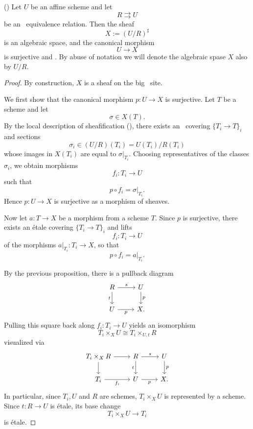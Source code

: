 \begin{lemma}
	\label{lem:etale-eq-quotient-of-affines}
	(\cite[Tag 03I2]{stacks-project})
	Let $U$ be an affine scheme and let
	\[
	R \rightrightarrows U
	\]
	be an \etale\ equivalence relation. Then the sheaf
	\[
	X:=(U/R)^\sharp
	\]
	is an algebraic space, and the canonical morphism
	\[
	U\to X
	\]
	is surjective and \etale.
	By abuse of notation we will denote the algebraic spase $X$ also by $U/R$.
\end{lemma}

\begin{proof}
	By construction, $X$ is a sheaf on the big \etale\ site.
	
	We first show that the canonical morphism $p:U\to X$ is surjective. Let $T$ be a scheme and let
	\[
	\sigma\in X(T).
	\]
	By the local description of sheafification (\cite[][Tag 00WK]{stacks-project}), there exists an \etale\ covering $\{T_i\to T\}_i$ and sections
	\[
	\sigma_i\in (U/R)(T_i)=U(T_i)/R(T_i)
	\]
	whose images in $X(T_i)$ are equal to $\sigma|_{T_i}$. Choosing representatives of the classes $\sigma_i$, we obtain morphisms
	\[
	f_i:T_i\to U
	\]
	such that
	\[
	p\circ f_i=\sigma|_{T_i}.
	\]
	Hence $p:U\to X$ is surjective as a morphism of sheaves.
	
	Now let $a:T\to X$ be a morphism from a scheme $T$. Since $p$ is surjective, there exists an \'etale covering $\{T_i\to T\}_i$ and lifts
	\[
	f_i:T_i\to U
	\]
	of the morphisms $a|_{T_i}:T_i\to X$, so that
	\[
	p\circ f_i=a|_{T_i}.
	\]
	
	By the previous proposition, there is a pullback diagram
	\[
	\begin{tikzcd}
		R \arrow[r,"s"] \arrow[d,"t"'] & U \arrow[d,"p"] \\
		U \arrow[r,"p"'] & X.
	\end{tikzcd}
	\]
	Pulling this square back along $f_i:T_i\to U$ yields an isomorphism
	\[
	T_i\times_X U \cong T_i\times_{U,t} R 
	\]
	visualized via
	\[\begin{tikzcd}
		{T_i\times_XR} & R & U \\
		{T_i} & U & X.
		\arrow[from=1-1, to=1-2]
		\arrow[from=1-1, to=2-1]
		\arrow["s", from=1-2, to=1-3]
		\arrow["t"', from=1-2, to=2-2]
		\arrow["p", from=1-3, to=2-3]
		\arrow["{f_i}"', from=2-1, to=2-2]
		\arrow["p"', from=2-2, to=2-3]
	\end{tikzcd}\]
	In particular, since $T_i, U$ and $R$ are schemes, $T_i\times_X U$ is represented by a scheme. Since $t:R\to U$ is \'etale, its base change
	\[
	T_i\times_X U \to T_i
	\]
	is \'etale.
	

\end{proof}
